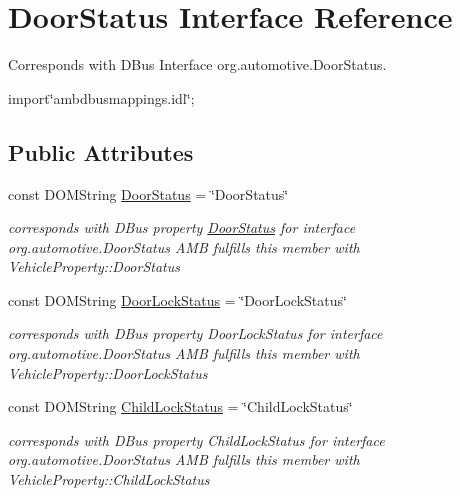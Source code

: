 \hypertarget{interfaceDoorStatus}{\section{Door\+Status Interface Reference}
\label{interfaceDoorStatus}
}


Corresponds with D\+Bus Interface org.\+automotive.\+Door\+Status.  




{\ttfamily import\char`\"{}ambdbusmappings.\+idl\char`\"{};}

\subsection*{Public Attributes}
\begin{DoxyCompactItemize}
\item 
\hypertarget{interfaceDoorStatus_ab8977ee56597373293c07dd5afac475d}{const D\+O\+M\+String \hyperlink{interfaceDoorStatus_ab8977ee56597373293c07dd5afac475d}{Door\+Status} = \char`\"{}Door\+Status\char`\"{}}\label{interfaceDoorStatus_ab8977ee56597373293c07dd5afac475d}

\begin{DoxyCompactList}\small\item\em corresponds with D\+Bus property \hyperlink{interfaceDoorStatus}{Door\+Status} for interface org.\+automotive.\+Door\+Status A\+M\+B fulfills this member with Vehicle\+Property\+::\+Door\+Status \end{DoxyCompactList}\item 
\hypertarget{interfaceDoorStatus_a247ed5ad35c7921041979a3720e54189}{const D\+O\+M\+String \hyperlink{interfaceDoorStatus_a247ed5ad35c7921041979a3720e54189}{Door\+Lock\+Status} = \char`\"{}Door\+Lock\+Status\char`\"{}}\label{interfaceDoorStatus_a247ed5ad35c7921041979a3720e54189}

\begin{DoxyCompactList}\small\item\em corresponds with D\+Bus property Door\+Lock\+Status for interface org.\+automotive.\+Door\+Status A\+M\+B fulfills this member with Vehicle\+Property\+::\+Door\+Lock\+Status \end{DoxyCompactList}\item 
\hypertarget{interfaceDoorStatus_a1f26de9c8b47568fc38fc219db74883b}{const D\+O\+M\+String \hyperlink{interfaceDoorStatus_a1f26de9c8b47568fc38fc219db74883b}{Child\+Lock\+Status} = \char`\"{}Child\+Lock\+Status\char`\"{}}\label{interfaceDoorStatus_a1f26de9c8b47568fc38fc219db74883b}

\begin{DoxyCompactList}\small\item\em corresponds with D\+Bus property Child\+Lock\+Status for interface org.\+automotive.\+Door\+Status A\+M\+B fulfills this member with Vehicle\+Property\+::\+Child\+Lock\+Status \end{DoxyCompactList}\end{DoxyCompactItemize}


